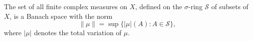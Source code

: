 The set of all finite complex measures on $X$, defined on the $\sigma$-ring $\mathcal{S}$ of subsets of $X$, is a Banach space with the norm
$$\|\mu\| = \sup \{|\mu|(A) : A \in \mathcal{S}\},$$
where $|\mu|$ denotes the total variation of $\mu$.
